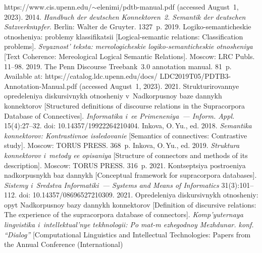 \begin{multicols}{2}
{{\begin{thebibliography}{99}
{https://www.cis.upenn.edu/$\sim$elenimi/\linebreak pdtb-manual.pdf} (accessed August~1, 
2023).
 2014. 
\textit{Handbuch der deutschen Konnektoren~2. Semantik der deutschen Satzverkn$\ddot{\mbox{u}}$pfer}. Berlin: Walter de Gruyter. 
1327~p.
 2019. Logiko-semanticheskie otno\-she\-niya: prob\-le\-my klas\-si\-fi\-ka\-tsii 
[Logical-semantic relations: Classification problems]. \textit{Svyaz\-nost' teks\-ta: 
me\-reo\-lo\-gi\-che\-skie  logiko-semanticheskie ot\-no\-she\-niya} [Text Coherence: Mereological Logical Semantic 
Relations]. Moscow: LRC 
Publs. 11--98.
 2019. The Penn Discourse Treebank~3.0 annotation 
manual. 81~p. Available at: {\sf https://catalog.ldc.upenn.edu/docs/
LDC2019T05/PDTB3-Annotation-Manual.pdf} 
(accessed August~1, 2023).
 2021. Struk\-tu\-ri\-ro\-van\-nye opre\-de\-le\-niya  
dis\-kur\-siv\-nykh ot\-no\-she\-niy v~Nad\-kor\-pus\-noy ba\-ze dan\-nykh  
kon\-nek\-to\-rov [Structured definitions of discourse relations in the Supracorpora Database of Connectives]. 
\textit{In\-for\-ma\-ti\-ka i~ee Pri\-me\-ne\-niya~--- Inform. Appl.} 15(4):27--32. doi: 10.14357/19922264210404.
Inkova, O.\,Yu., ed. 2018. \textit{Se\-man\-ti\-ka kon\-nek\-to\-rov:  
Kont\-ras\-tiv\-noe is\-sle\-do\-va\-nie} [Semantics of connectives: Contrastive study]. Moscow: TORUS PRESS. 368~p.
Inkova, O.\,Yu., ed. 2019. \textit{Struk\-tu\-ra kon\-nek\-to\-rov i~me\-to\-dy ee  
opi\-sa\-niya} [Structure of connectors and methods of its description]. Moscow: TORUS PRESS. 316~p.
 2021. Kon\-tsep\-tsiya po\-stro\-eniya nad\-kor\-pus\-nykh 
baz dan\-nykh [Conceptual framework for supracorpora databases]. 
 \textit{Sis\-te\-my i~Sred\-st\-va In\-for\-ma\-ti\-ki~--- Systems and Means of Informatics} 31(3):101--112.
  doi: 10.14357/08696527210309.
 2021. Opre\-de\-le\-niya dis\-kur\-siv\-nykh ot\-no\-she\-niy: 
opyt Nad\-kor\-pus\-noy bazy dan\-nykh kon\-nek\-to\-rov [Definition of discursive relations: The experience 
of the supracorpora database of connectors]. \textit{Komp'yu\-ter\-naya 
 ling\-vi\-sti\-ka i~in\-tel\-lek\-tu\-al'\-nye tekh\-no\-lo\-gii: 
Po mat-m ezhegodnoy Mezhdunar.  konf. ``Dialog''} [Computational Linguistics and 
Intellectual Technologies: Papers from the Annual Conference (International) 

\end{thebibliography}}}
\end{multicols}
